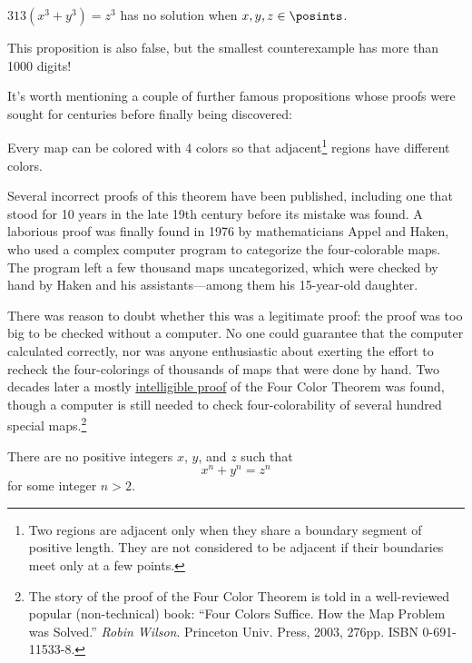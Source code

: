 \begin{proposition}
$313 (x^3 + y^3) = z^3$ has no solution when $x, y, z\in\posints$.
\end{proposition}

This proposition is also false, but the smallest counterexample has
more than 1000 digits!

It's worth mentioning a couple of further famous propositions whose
proofs were sought for centuries before finally being discovered:

\begin{proposition}\label{4colorprop}
  Every map can be colored with 4 colors so that adjacent\footnote{Two
    regions are adjacent only when they share a boundary segment of
    positive length.  They are not considered to be adjacent if their
    boundaries meet only at a few points.} regions have different
  colors.
\end{proposition}

Several incorrect proofs of this theorem have been published,
including one that stood for 10 years in the late 19th century before
its mistake was found.  A laborious proof was finally found in 1976 by
mathematicians Appel and Haken, who used a complex computer program to
categorize the four-colorable maps.  The program left a few thousand
maps uncategorized, which were checked by hand by Haken and his
assistants---among them his 15-year-old daughter.  

There was reason to doubt whether this was a legitimate proof: the
proof was too big to be checked without a computer.  No one could
guarantee that the computer calculated correctly, nor was anyone
enthusiastic about exerting the effort to recheck the four-colorings
of thousands of maps that were done by hand.  Two decades later a
mostly
\href{http://www.math.gatech.edu/~thomas/FC/fourcolor.html}{intelligible
  proof} of the Four Color Theorem was found, though a computer is
still needed to check four-colorability of several hundred special
maps.\footnote{The story of the proof of the Four Color Theorem is
  told in a well-reviewed popular (non-technical) book: ``Four Colors
  Suffice.  How the Map Problem was Solved.'' \emph{Robin Wilson}.
  Princeton Univ. Press, 2003, 276pp. ISBN 0-691-11533-8.}

\begin{proposition}\label{fermatlast}
There are no positive integers $x$, $y$, and $z$ such that
\[
x^n + y^n = z^n
\]
for some integer $n > 2$.
\end{proposition}

